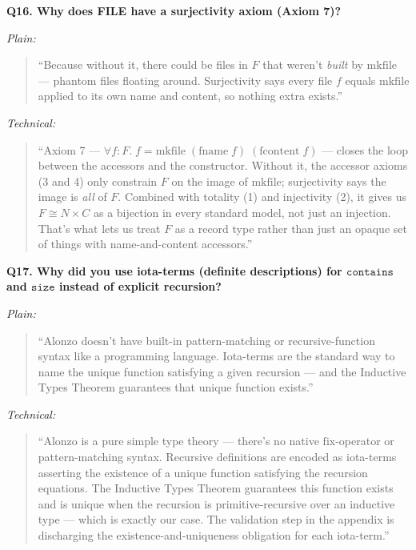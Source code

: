 \documentclass[12pt]{article}
\newenvironment{say}{%
  \par\medskip%
  \begin{quote}%
  \setlength{\parskip}{0.7em}%
  \large\itshape%
}{%
  \end{quote}%
  \medskip%
}
\begin{document}
\vspace{0.8em}
\textbf{\color{slidebar}Q16. Why does FILE have a surjectivity axiom (Axiom 7)?}

\textit{\color{pauseclr}Plain:}
\begin{say}
``Because without it, there could be files in $F$ that weren't \emph{built} by $\mathrm{mkfile}$ --- phantom files floating around. Surjectivity says every file $f$ equals $\mathrm{mkfile}$ applied to its own name and content, so nothing extra exists.''
\end{say}

\textit{\color{pauseclr}Technical:}
\begin{say}
``Axiom 7 --- $\forall f : F.\; f = \mathrm{mkfile}\;(\mathrm{fname}\;f)\;(\mathrm{fcontent}\;f)$ --- closes the loop between the accessors and the constructor. Without it, the accessor axioms (3 and 4) only constrain $F$ on the image of $\mathrm{mkfile}$; surjectivity says the image is \emph{all} of $F$. Combined with totality (1) and injectivity (2), it gives us $F \cong N \times C$ as a bijection in every standard model, not just an injection. That's what lets us treat $F$ as a record type rather than just an opaque set of things with name-and-content accessors.''
\end{say}

\vspace{0.8em}
\textbf{\color{slidebar}Q17. Why did you use iota-terms (definite descriptions) for $\mathtt{contains}$ and $\mathtt{size}$ instead of explicit recursion?}

\textit{\color{pauseclr}Plain:}
\begin{say}
``Alonzo doesn't have built-in pattern-matching or recursive-function syntax like a programming language. Iota-terms are the standard way to name the unique function satisfying a given recursion --- and the Inductive Types Theorem guarantees that unique function exists.''
\end{say}

\textit{\color{pauseclr}Technical:}
\begin{say}
``Alonzo is a pure simple type theory --- there's no native $\mathrm{fix}$-operator or pattern-matching syntax. Recursive definitions are encoded as iota-terms asserting the existence of a unique function satisfying the recursion equations. The Inductive Types Theorem guarantees this function exists and is unique when the recursion is primitive-recursive over an inductive type --- which is exactly our case. The validation step in the appendix is discharging the existence-and-uniqueness obligation for each iota-term.''
\end{say}
\end{document}
